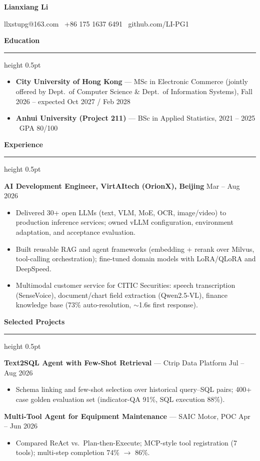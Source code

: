 \documentclass[10pt]{ctexart}
\newcommand{\sectionhead}[1]{%
  \needspace{3\baselineskip}%
  \vspace{6pt}%
  {\normalsize\bfseries #1}%
  \vspace{2pt}%
  \hrule height 0.5pt
  \vspace{3pt}%
}
\newcommand{\name}[1]{{\Large\bfseries #1}}
\begin{document}
\fancyhead[R]{\small}

\begin{center}
  \name{Lianxiang Li}
\end{center}

\begin{center}
  llxstupg@163.com \textbar\ +86 175 1637 6491 \textbar\ github.com/LI-PG1
\end{center}

\sectionhead{Education}
\begin{itemize}
  \item \textbf{City University of Hong Kong} — MSc in Electronic Commerce (jointly offered by Dept.\ of Computer Science \& Dept.\ of Information Systems), Fall 2026 -- expected Oct 2027 / Feb 2028
  \item \textbf{Anhui University (Project 211)} — BSc in Applied Statistics, 2021 -- 2025 \textbar\ GPA 80/100
\end{itemize}

\sectionhead{Experience}
\textbf{AI Development Engineer, VirtAItech (OrionX), Beijing} \hfill Mar -- Aug 2026
\begin{itemize}
  \item Delivered 30+ open LLMs (text, VLM, MoE, OCR, image/video) to production inference services; owned vLLM configuration, environment adaptation, and acceptance evaluation.
  \item Built reusable RAG and agent frameworks (embedding + rerank over Milvus, tool-calling orchestration); fine-tuned domain models with LoRA/QLoRA and DeepSpeed.
  \item Multimodal customer service for CITIC Securities: speech transcription (SenseVoice), document/chart field extraction (Qwen2.5-VL), finance knowledge base (73\% auto-resolution, $\sim$1.6s first response).
\end{itemize}

\sectionhead{Selected Projects}
\textbf{Text2SQL Agent with Few-Shot Retrieval} — Ctrip Data Platform \hfill Jul -- Aug 2026
\begin{itemize}
  \item Schema linking and few-shot selection over historical query--SQL pairs; 400+ case golden evaluation set (indicator-QA 91\%, SQL execution 88\%).
\end{itemize}

\textbf{Multi-Tool Agent for Equipment Maintenance} — SAIC Motor, POC \hfill Apr -- Jun 2026
\begin{itemize}
  \item Compared ReAct vs.\ Plan-then-Execute; MCP-style tool registration (7 tools); multi-step completion 74\% $\rightarrow$ 86\%.
\end{itemize}
\end{document}
